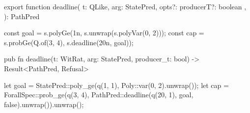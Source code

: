 \begin{tssrc}
export function deadline(
  t: QLike,
  arg: StatePred,
  opts?: { producerT?: boolean },
): PathPred
\end{tssrc}
\begin{tssrc}
const goal = s.polyGe(1n, s.unwrap(s.polyVar(0, 2)));
const cap = s.probGe(Q.of(3, 4), s.deadline(20n, goal));
\end{tssrc}
\begin{rustsrc}
pub fn deadline(t: WitRat, arg: StatePred, producer_t: bool) -> Result<PathPred, Refusal>
\end{rustsrc}
\begin{rustsrc}
let goal = StatePred::poly_ge(q(1, 1), Poly::var(0, 2).unwrap());
let cap =
    ForallSpec::prob_ge(q(3, 4), PathPred::deadline(q(20, 1), goal, false).unwrap()).unwrap();
\end{rustsrc}

